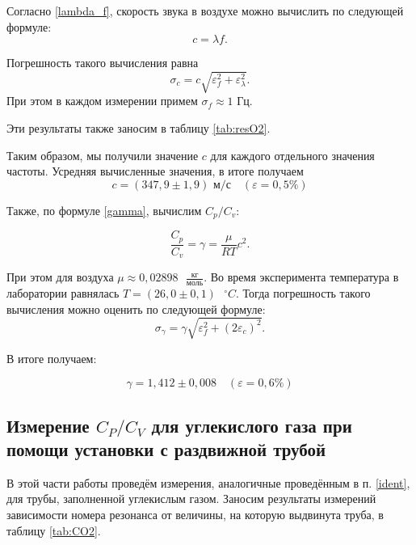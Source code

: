 \documentclass[a4paper,12pt]{article}
\theoremstyle{definition}
\begin{document}
	Согласно \eqref{lambda_f}, скорость звука в воздухе можно вычислить по следующей формуле: 
	\[ c = \lambda f. \]
	
	Погрешность такого вычисления равна \[ \sigma_c=c\sqrt{\varepsilon_f^2+\varepsilon_\lambda^2}. \] При этом в каждом измерении примем $ \sigma_f \approx 1 $ Гц.
	
	Эти результаты также заносим в таблицу \ref{tab:resO2}.
	
	Таким образом, мы получили значение $ c $ для каждого отдельного значения частоты. Усредняя вычисленные значения, в итоге получаем \[\boxed{ c = (347,9 \pm 1,9) \text{ м/с}}\quad (\varepsilon=0,5\%) \]
	
	Также, по формуле \eqref{gamma}, вычислим $ C_p/C_v $:
	
	\[ \frac{C_p}{C_v} = \gamma = \frac{\mu}{RT}c^2. \]
	
	При этом для воздуха $ \displaystyle \mu \approx 0,02898 \text{ } \frac{\text{кг}}{\text{моль}} $. Во время эксперимента температура в лаборатории равнялась $ T = (26,0 \pm 0,1) \text{ } ^\circ C $. Тогда погрешность такого вычисления можно оценить по следующей формуле:
	\[ \sigma_\gamma = \gamma\sqrt{\varepsilon_f^2+\left(2\varepsilon_c\right)^2}.\]
	
	В итоге получаем:
	
	\[ \boxed{\gamma = 1,412 \pm 0,008}\quad (\varepsilon=0,6\%) \]
	
	\subsection{Измерение $ C_P/C_V $ для углекислого газа при помощи установки с раздвижной трубой}
	
	В этой части работы проведём измерения, аналогичные проведённым в п. \ref{ident}, для трубы, заполненной углекислым газом. Заносим результаты измерений зависимости номера резонанса от величины, на которую выдвинута труба, в таблицу \ref{tab:CO2}.
\end{document}
